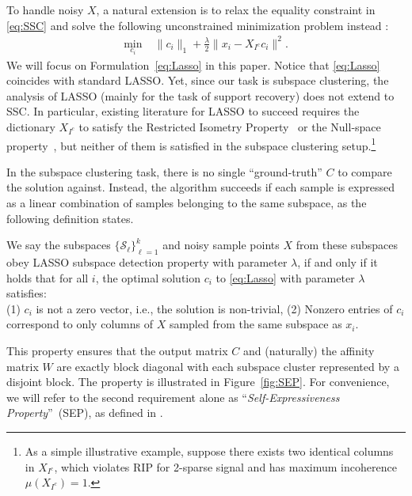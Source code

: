 \documentclass[main]{subfiles}
\begin{document}
To handle noisy $X$, a natural extension is to relax the equality constraint in \eqref{eq:SSC} and solve the following unconstrained minimization problem instead \cite{elhamifar2012ssc_journal}:
\begin{equation}\label{eq:Lasso}
\begin{aligned}
\min_{c_i} \; &\|c_i\|_1+\frac{\lambda}{2}\|x_i-X_{I^c}c_i\|^2.
\end{aligned}
\end{equation}
We will focus on Formulation~\eqref{eq:Lasso} in this paper. Notice that \eqref{eq:Lasso} coincides with standard LASSO. Yet, since our task is subspace clustering, the analysis of LASSO (mainly for the task of support recovery) does not extend to SSC. In particular, existing literature for LASSO to succeed requires the dictionary $X_{I^c}$ to satisfy the Restricted Isometry Property~\cite[RIP for short;][]{candes2008RIP} or the Null-space property~\cite{donoho2006BPDN},  but neither of them is satisfied in the subspace clustering setup.\footnote{As a simple illustrative example, suppose there exists two identical columns in $X_{I^c}$, which violates RIP for 2-sparse signal and has maximum incoherence $\mu(X_{I^c})=1$.}

In the subspace clustering task, there is no single ``ground-truth'' $C$ to compare the solution against. Instead, the algorithm succeeds if each sample is expressed as a linear combination of samples belonging to the same subspace, as the following definition states.
\begin{definition}\label{def:lasso_detection}
We say the subspaces $\{\mathcal{S}_{\ell}\}_{\ell=1}^{k}$ and noisy sample points $X$ from these subspaces obey LASSO subspace detection property with parameter $\lambda$, if and only if it holds that for all $i$, the optimal solution $c_i$ to \eqref{eq:Lasso} with parameter $\lambda$ satisfies:\\
\indent (1) $c_i$ is not a zero vector, i.e., the solution is non-trivial,
\indent (2) Nonzero entries of $c_i$ correspond to only columns of $X$ sampled from the same subspace as $x_i$.
\end{definition}
This property ensures that the output matrix $C$ and (naturally) the affinity matrix $W$ are exactly block diagonal with each subspace cluster represented by a disjoint block.  The property is illustrated in Figure~\ref{fig:SEP}. For convenience, we will refer to the second requirement alone as ``\emph{Self-Expressiveness Property}''~(SEP), as defined in \cite{elhamifar2012ssc_journal}.
\end{document}
